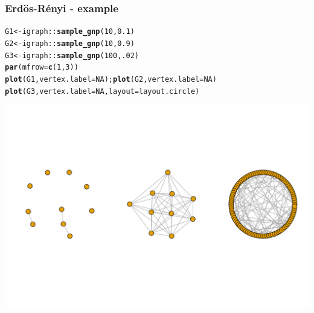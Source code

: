 \documentclass{beamer}\usepackage[]{graphicx}\usepackage[]{color}
\makeatletter
\newcommand{\hlnum}[1]{\textcolor[rgb]{0.686,0.059,0.569}{#1}}%
\newcommand{\hlopt}[1]{\textcolor[rgb]{0,0,0}{#1}}%
\newcommand{\hlstd}[1]{\textcolor[rgb]{0.345,0.345,0.345}{#1}}%
\newcommand{\hlkwb}[1]{\textcolor[rgb]{0.69,0.353,0.396}{#1}}%
\newcommand{\hlkwc}[1]{\textcolor[rgb]{0.333,0.667,0.333}{#1}}%
\newcommand{\hlkwd}[1]{\textcolor[rgb]{0.737,0.353,0.396}{\textbf{#1}}}%
\newenvironment{kframe}{%
 \def\at@end@of@kframe{}%
 \ifinner\ifhmode%
  \def\at@end@of@kframe{\end{minipage}}%
  \begin{minipage}{\columnwidth}%
 \fi\fi%
 \def\FrameCommand##1{\hskip\@totalleftmargin \hskip-\fboxsep
 \colorbox{shadecolor}{##1}\hskip-\fboxsep
     \hskip-\linewidth \hskip-\@totalleftmargin \hskip\columnwidth}%
 \MakeFramed {\advance\hsize-\width
   \@totalleftmargin\z@ \linewidth\hsize
   \@setminipage}}%
 {\par\unskip\endMakeFramed%
 \at@end@of@kframe}
\newenvironment{knitrout}{}{} %
\makeatother
\begin{document}
\begin{frame}[fragile]
  \frametitle{Erdös-Rényi - example}

\begin{knitrout}\scriptsize
{}\color{fgcolor}\begin{kframe}
\begin{alltt}
\hlstd{G1} \hlkwb{<-} \hlstd{igraph}\hlopt{::}\hlkwd{sample_gnp}\hlstd{(}\hlnum{10}\hlstd{,} \hlnum{0.1}\hlstd{)}
\hlstd{G2} \hlkwb{<-} \hlstd{igraph}\hlopt{::}\hlkwd{sample_gnp}\hlstd{(}\hlnum{10}\hlstd{,} \hlnum{0.9}\hlstd{)}
\hlstd{G3} \hlkwb{<-} \hlstd{igraph}\hlopt{::}\hlkwd{sample_gnp}\hlstd{(}\hlnum{100}\hlstd{,} \hlnum{.02}\hlstd{)}
\hlkwd{par}\hlstd{(}\hlkwc{mfrow}\hlstd{=}\hlkwd{c}\hlstd{(}\hlnum{1}\hlstd{,}\hlnum{3}\hlstd{))}
\hlkwd{plot}\hlstd{(G1,} \hlkwc{vertex.label}\hlstd{=}\hlnum{NA}\hlstd{) ;} \hlkwd{plot}\hlstd{(G2,} \hlkwc{vertex.label}\hlstd{=}\hlnum{NA}\hlstd{)}
\hlkwd{plot}\hlstd{(G3,} \hlkwc{vertex.label}\hlstd{=}\hlnum{NA}\hlstd{,} \hlkwc{layout}\hlstd{=layout.circle)}
\end{alltt}
\end{kframe}
\includegraphics[width=.8\textwidth]{figures/ER_example-1} 

\end{knitrout}
\end{frame}
\end{document}
